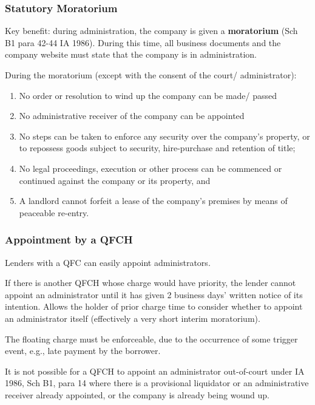 \documentclass[
]{article}
\providecommand{\tightlist}{%
  \setlength{\itemsep}{0pt}\setlength{\parskip}{0pt}}
\begin{document}
\hypertarget{statutory-moratorium}{%
\subsubsection{Statutory Moratorium}\label{statutory-moratorium}}

Key benefit: during administration, the company is given a
\textbf{moratorium} (Sch B1 para 42-44 IA 1986). During this time, all
business documents and the company website must state that the company
is in administration.

During the moratorium (except with the consent of the court/
administrator):

\begin{enumerate}
\tightlist
\item
  No order or resolution to wind up the company can be made/ passed
\item
  No administrative receiver of the company can be appointed
\item
  No steps can be taken to enforce any security over the company's
  property, or to repossess goods subject to security, hire-purchase and
  retention of title;
\item
  No legal proceedings, execution or other process can be commenced or
  continued against the company or its property, and
\item
  A landlord cannot forfeit a lease of the company's premises by means
  of peaceable re-entry.
\end{enumerate}

\hypertarget{appointment-by-a-qfch}{%
\subsubsection{Appointment by a QFCH}\label{appointment-by-a-qfch}}

Lenders with a QFC can easily appoint administrators.

If there is another QFCH whose charge would have priority, the lender
cannot appoint an administrator until it has given 2 business days'
written notice of its intention. Allows the holder of prior charge time
to consider whether to appoint an administrator itself (effectively a
very short interim moratorium).

The floating charge must be enforceable, due to the occurrence of some
trigger event, e.g., late payment by the borrower.

It is not possible for a QFCH to appoint an administrator out-of-court
under IA 1986, Sch B1, para 14 where there is a provisional liquidator
or an administrative receiver already appointed, or the company is
already being wound up.
\end{document}
